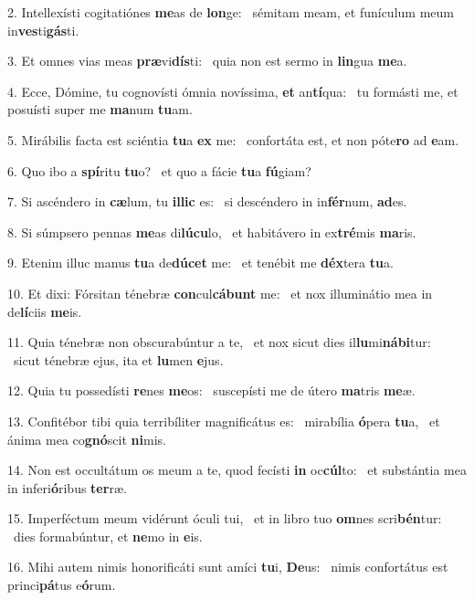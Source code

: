 2. Intellexísti cogitatiónes \textbf{me}as de \textbf{lon}ge: \ast\  sémitam meam, et funículum meum in\textbf{ves}ti\textbf{gás}ti.\

3. Et omnes vias meas \textbf{præ}vi\textbf{dís}ti: \ast\  quia non est sermo in \textbf{lin}gua \textbf{me}a.\

4. Ecce, Dómine, tu cognovísti ómnia novíssima, \textbf{et} an\textbf{tí}qua: \ast\  tu formásti me, et posuísti super me \textbf{ma}num \textbf{tu}am.\

5. Mirábilis facta est sciéntia \textbf{tu}a \textbf{ex} me: \ast\  confortáta est, et non póte\textbf{ro} ad \textbf{e}am.\

6. Quo ibo a \textbf{spí}ritu \textbf{tu}o? \ast\  et quo a fácie \textbf{tu}a \textbf{fú}giam?\

7. Si ascéndero in \textbf{cæ}lum, tu \textbf{il}\textbf{lic} es: \ast\  si descéndero in in\textbf{fér}num, \textbf{ad}es.\

8. Si súmpsero pennas \textbf{me}as di\textbf{lú}\textbf{cu}lo, \ast\  et habitávero in ex\textbf{tré}mis \textbf{ma}ris.\

9. Etenim illuc manus \textbf{tu}a de\textbf{dú}\textbf{cet} me: \ast\  et tenébit me \textbf{déx}tera \textbf{tu}a.\

10. Et dixi: Fórsitan ténebræ \textbf{con}cul\textbf{cá}\textbf{bunt} me: \ast\  et nox illuminátio mea in de\textbf{lí}ciis \textbf{me}is.\

11. Quia ténebræ non obscurabúntur a te, \dag\  et nox sicut dies il\textbf{lu}mi\textbf{ná}\textbf{bi}tur: \ast\  sicut ténebræ ejus, ita et \textbf{lu}men \textbf{e}jus.\

12. Quia tu possedísti \textbf{re}nes \textbf{me}os: \ast\  suscepísti me de útero \textbf{ma}tris \textbf{me}æ.\

13. Confitébor tibi quia terribíliter magnificátus es: \dag\  mirabília \textbf{ó}pera \textbf{tu}a, \ast\  et ánima mea co\textbf{gnó}scit \textbf{ni}mis.\

14. Non est occultátum os meum a te, quod fecísti \textbf{in} oc\textbf{cúl}to: \ast\  et substántia mea in inferi\textbf{ó}ribus \textbf{ter}ræ.\

15. Imperféctum meum vidérunt óculi tui, \dag\  et in libro tuo \textbf{om}nes scri\textbf{bén}tur: \ast\  dies formabúntur, et \textbf{ne}mo in \textbf{e}is.\

16. Mihi autem nimis honorificáti sunt amíci \textbf{tu}i, \textbf{De}us: \ast\  nimis confortátus est princi\textbf{pá}tus e\textbf{ó}rum.\

